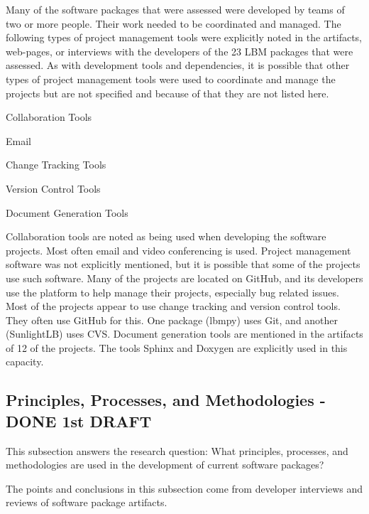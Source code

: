 \documentclass[12pt, notitlepage]{article}
\begin{document}
Many of the software packages that were assessed were developed by teams of two or more people. Their work needed to be coordinated and managed. The following types of project management tools were explicitly noted in the artifacts, web-pages, or interviews with the developers of the 23 LBM packages that were assessed. As with development tools and dependencies, it is possible that other types of project management tools were used to coordinate and manage the projects but are not specified and because of that they are not listed here.

	\begin{multicols}{2}	
		\begin{itemize}
		\end{itemize}
	\end{multicols}


Collaboration tools are noted as being used when developing the software projects. Most often email and video conferencing is used. Project management software was not explicitly mentioned, but it is possible that some of the projects use such software. Many of the projects are located on GitHub, and its developers use the platform to help manage their projects, especially bug related issues. Most of the projects appear to use change tracking and version control tools. They often use GitHub for this. One package (lbmpy) uses Git, and another (SunlightLB) uses CVS. Document generation tools are mentioned in the artifacts of 12 of the projects. The tools Sphinx and Doxygen are explicitly used in this capacity. 

\subsection{Principles, Processes, and Methodologies - DONE 1st DRAFT}\label{prinprocmeth}

This subsection answers the research question: What principles, processes, and methodologies are used in the development of current software packages?

The points and conclusions in this subsection come from developer interviews and reviews of software package artifacts.
\end{document}
